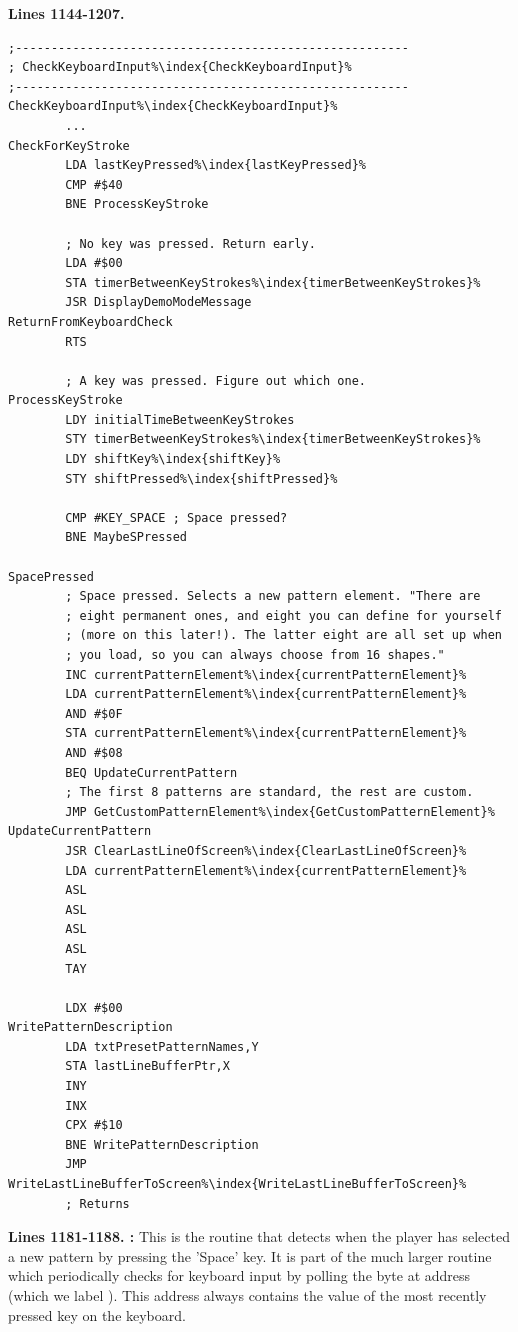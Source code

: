 \clearpage
\textbf{Lines 1144-1207. } 
\begin{lstlisting}[basicstyle=\ttfamily\scriptsize,escapechar=\%]
;-------------------------------------------------------
; CheckKeyboardInput%\index{CheckKeyboardInput}%
;-------------------------------------------------------
CheckKeyboardInput%\index{CheckKeyboardInput}%   
        ...
CheckForKeyStroke   
        LDA lastKeyPressed%\index{lastKeyPressed}%
        CMP #$40
        BNE ProcessKeyStroke

        ; No key was pressed. Return early.
        LDA #$00
        STA timerBetweenKeyStrokes%\index{timerBetweenKeyStrokes}%
        JSR DisplayDemoModeMessage
ReturnFromKeyboardCheck   
        RTS 

        ; A key was pressed. Figure out which one.
ProcessKeyStroke   
        LDY initialTimeBetweenKeyStrokes
        STY timerBetweenKeyStrokes%\index{timerBetweenKeyStrokes}%
        LDY shiftKey%\index{shiftKey}%
        STY shiftPressed%\index{shiftPressed}%

        CMP #KEY_SPACE ; Space pressed?
        BNE MaybeSPressed

SpacePressed
        ; Space pressed. Selects a new pattern element. "There are
        ; eight permanent ones, and eight you can define for yourself
        ; (more on this later!). The latter eight are all set up when
        ; you load, so you can always choose from 16 shapes."
        INC currentPatternElement%\index{currentPatternElement}%
        LDA currentPatternElement%\index{currentPatternElement}%
        AND #$0F
        STA currentPatternElement%\index{currentPatternElement}%
        AND #$08
        BEQ UpdateCurrentPattern
        ; The first 8 patterns are standard, the rest are custom.
        JMP GetCustomPatternElement%\index{GetCustomPatternElement}%
UpdateCurrentPattern   
        JSR ClearLastLineOfScreen%\index{ClearLastLineOfScreen}%
        LDA currentPatternElement%\index{currentPatternElement}%
        ASL 
        ASL 
        ASL 
        ASL 
        TAY 

        LDX #$00
WritePatternDescription   
        LDA txtPresetPatternNames,Y
        STA lastLineBufferPtr,X
        INY 
        INX 
        CPX #$10
        BNE WritePatternDescription
        JMP WriteLastLineBufferToScreen%\index{WriteLastLineBufferToScreen}%
        ; Returns
\end{lstlisting}
\clearpage

\textbf{Lines 1181-1188. :} This is the routine that detects when the player has selected a new
pattern by pressing the 'Space' key. It is part of the much larger routine  which periodically checks
for keyboard input by polling the byte at address  (which we label ). This address always
contains the value of the most recently pressed key on the keyboard.

